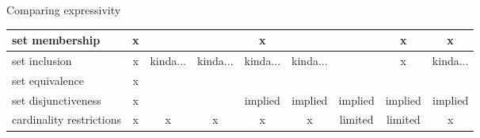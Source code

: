 \begin{frame}{Comparing expressivity}
\begin{table}
{\begin{tabular}{lcccccccc}
    set membership           & x                    &                &                   & x                  &                                                                   &                                                                   & x                  & x                     \\ \hline
    set inclusion            & x                    & kinda...       & kinda...          & kinda...           & kinda...                                                          &                                                                   & x                  & kinda...              \\ \hline
    set equivalence          & x                    &                &                   &                    &                                                                   &                                                                   &                    &                       \\ \hline
    set disjunctiveness      & x                    &                &                   & implied            & implied                                                           & implied                                                           & implied            & implied               \\ \hline
    cardinality restrictions & x                    & x              & x                 & x                  & x                                                                 & limited                                                           & limited            & x                    
    \end{tabular}
    }
\end{table}
    

    
\end{frame}